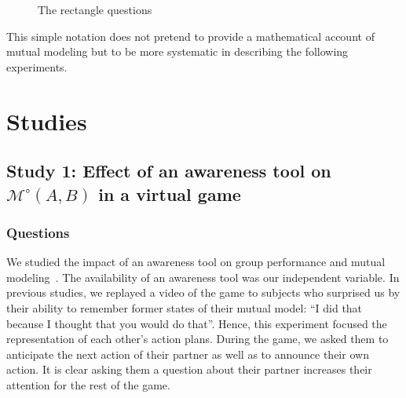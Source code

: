 \documentclass[twocolumn]{article}
\newcommand{\Model}[3]{{$\mathcal{M}^{\circ}(#1, #2, #3)$}}
\newcommand{\gModel}[2]{{$\mathcal{M}^{\circ}(#1, #2)$}}
\begin{document}
\begin{figure}[htb]
\centering


\caption{The rectangle questions}

\label{mm_rectangle}
\end{figure}


This simple notation does not pretend to provide a mathematical account of
mutual modeling but to be more systematic in describing the following
experiments. 





\section{Studies}



\subsection{Study 1: Effect of an awareness tool on \gModel{A}{B} in a virtual
game}

\subsubsection*{Questions}

We studied the impact of an awareness tool on group performance and mutual
modeling~\citep{nova2007collaboration}. The availability
of an awareness tool was our independent variable. In previous studies, we
replayed a video of the game to subjects who surprised us by their ability to
remember former states of their mutual model: ``I did that because I thought that
you would do that''. Hence, this experiment focused the representation of each
other's action plans. During the game, we asked them to anticipate the next
action of their partner as well as to announce their own action. It is clear
asking them a question about their partner increases their attention for the
rest of the game.
\end{document}
